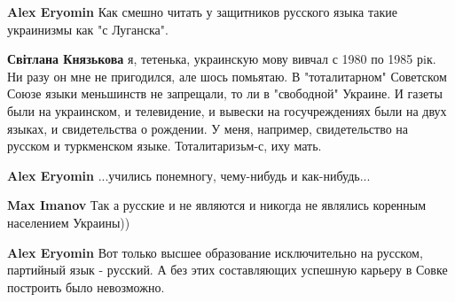 \begin{itemize}
\begin{itemize}
 
\textbf{Alex Eryomin} Как смешно читать у защитников русского языка такие украинизмы как "с Луганска".

 
\textbf{Світлана Князькова} я, тетенька, украинскую мову вивчал с 1980 по 1985 рiк. Ни разу он мне не пригодился, але шось помьятаю. В "тоталитарном" Советском Союзе языки меньшинств не запрещали, то ли в "свободной" Украине. И газеты были на украинском, и телевидение, и вывески на госучреждениях были на двух языках, и свидетельства о рождении. У меня, например, свидетельство на русском и туркменском языке. Тоталитаризьм-с, иху мать.

 
\textbf{Alex Eryomin} ...учились понемногу, чему-нибудь и как-нибудь...

 
\textbf{Max Imanov} Так а русские и не являются и никогда не являлись коренным населением Украины))

 
\textbf{Alex Eryomin} Вот только высшее образование исключительно на русском, партийный язык - русский. А без этих составляющих успешную карьеру в Совке построить было невозможно.

 

\end{itemize}
\end{itemize}
